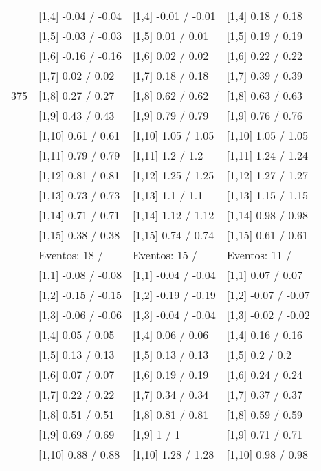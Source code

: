 \begin{table}
\begin{tabular}[t]{llll}
\addlinespace
 & {}[1,4] -0.04  / -0.04 & {}[1,4] -0.01  / -0.01 & {}[1,4] 0.18  / 0.18\\
 & {}[1,5] -0.03  / -0.03 & {}[1,5] 0.01  / 0.01 & {}[1,5] 0.19  / 0.19\\
 & {}[1,6] -0.16  / -0.16 & {}[1,6] 0.02  / 0.02 & {}[1,6] 0.22  / 0.22\\
 & {}[1,7] 0.02  / 0.02 & {}[1,7] 0.18  / 0.18 & {}[1,7] 0.39  / 0.39\\
375 & {}[1,8] 0.27  / 0.27 & {}[1,8] 0.62  / 0.62 & {}[1,8] 0.63  / 0.63\\
\addlinespace
 & {}[1,9] 0.43  / 0.43 & {}[1,9] 0.79  / 0.79 & {}[1,9] 0.76  / 0.76\\
 & {}[1,10] 0.61  / 0.61 & {}[1,10] 1.05  / 1.05 & {}[1,10] 1.05  / 1.05\\
 & {}[1,11] 0.79  / 0.79 & {}[1,11] 1.2  / 1.2 & {}[1,11] 1.24  / 1.24\\
 & {}[1,12] 0.81  / 0.81 & {}[1,12] 1.25  / 1.25 & {}[1,12] 1.27  / 1.27\\
 & {}[1,13] 0.73  / 0.73 & {}[1,13] 1.1  / 1.1 & {}[1,13] 1.15  / 1.15\\
\addlinespace
 & {}[1,14] 0.71  / 0.71 & {}[1,14] 1.12  / 1.12 & {}[1,14] 0.98  / 0.98\\
 & {}[1,15] 0.38  / 0.38 & {}[1,15] 0.74  / 0.74 & {}[1,15] 0.61  / 0.61\\
 & Eventos:  18 / & Eventos:  15 / & Eventos:  11 /\\
 & {}[1,1] -0.08  / -0.08 & {}[1,1] -0.04  / -0.04 & {}[1,1] 0.07  / 0.07\\
 & {}[1,2] -0.15  / -0.15 & {}[1,2] -0.19  / -0.19 & {}[1,2] -0.07  / -0.07\\
\addlinespace
 & {}[1,3] -0.06  / -0.06 & {}[1,3] -0.04  / -0.04 & {}[1,3] -0.02  / -0.02\\
 & {}[1,4] 0.05  / 0.05 & {}[1,4] 0.06  / 0.06 & {}[1,4] 0.16  / 0.16\\
 & {}[1,5] 0.13  / 0.13 & {}[1,5] 0.13  / 0.13 & {}[1,5] 0.2  / 0.2\\
 & {}[1,6] 0.07  / 0.07 & {}[1,6] 0.19  / 0.19 & {}[1,6] 0.24  / 0.24\\
 & {}[1,7] 0.22  / 0.22 & {}[1,7] 0.34  / 0.34 & {}[1,7] 0.37  / 0.37\\
\addlinespace
500 & {}[1,8] 0.51  / 0.51 & {}[1,8] 0.81  / 0.81 & {}[1,8] 0.59  / 0.59\\
 & {}[1,9] 0.69  / 0.69 & {}[1,9] 1  / 1 & {}[1,9] 0.71  / 0.71\\
 & {}[1,10] 0.88  / 0.88 & {}[1,10] 1.28  / 1.28 & {}[1,10] 0.98  / 0.98\\

\end{tabular}
\end{table}
